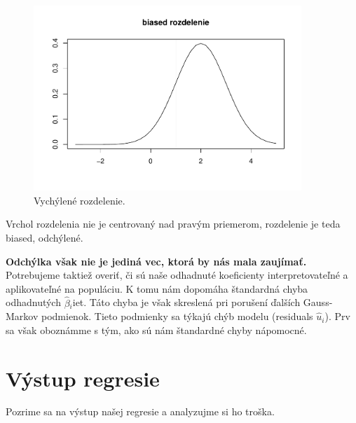 \begin{figure}[!ht]
\begin{center}
\includegraphics[width=0.9\textwidth,height=\textheight]{test_files/figure-latex/unnamed-chunk-45-1.pdf}
\caption{Vychýlené rozdelenie.}
\end{center}
\end{figure}

Vrchol rozdelenia nie je centrovaný nad pravým priemerom, rozdelenie je
teda biased, odchýlené.

\textbf{Odchýlka však nie je jediná vec, ktorá by nás mala zaujímať.}
Potrebujeme taktiež overiť, či sú naše odhadnuté koeficienty
interpretovateľné a aplikovateľné na populáciu. K tomu nám dopomáha
štandardná chyba odhadnutých \(\hat\beta{}_i\)iet. Táto chyba je však
skreslená pri porušení ďalších Gauss-Markov podmienok. Tieto podmienky
sa týkajú chýb modelu (residuals \(\hat u_i\)). Prv sa však oboznámme s
tým, ako sú nám štandardné chyby nápomocné.

\newpage

\hypertarget{vuxfdstup-regresie}{%
\section{Výstup regresie}\label{vuxfdstup-regresie}}

Pozrime sa na výstup našej regresie a analyzujme si ho troška.

\begin{Shaded}
\begin{Highlighting}[]
\end{Highlighting}
\end{Shaded}

